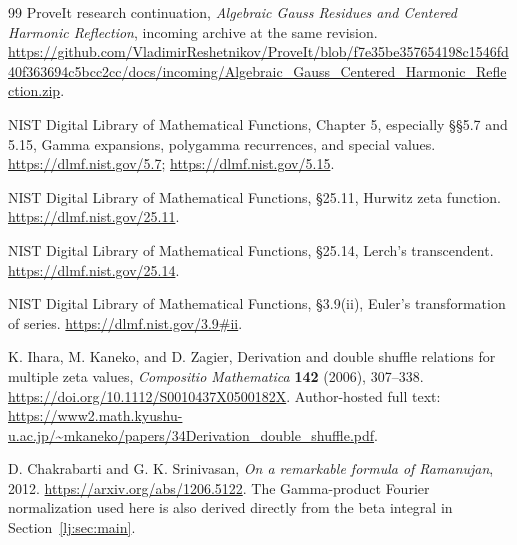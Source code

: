 \begin{thebibliography}{99}
ProveIt research continuation,
\emph{Algebraic Gauss Residues and Centered Harmonic Reflection},
incoming archive at the same revision.
\url{https://github.com/VladimirReshetnikov/ProveIt/blob/f7e35be357654198c1546fd40f363694c5bcc2cc/docs/incoming/Algebraic_Gauss_Centered_Harmonic_Reflection.zip}.

NIST Digital Library of Mathematical Functions,
Chapter 5, especially \S\S5.7 and 5.15,
Gamma expansions, polygamma recurrences, and special values.
\url{https://dlmf.nist.gov/5.7};
\url{https://dlmf.nist.gov/5.15}.

NIST Digital Library of Mathematical Functions,
\S25.11, Hurwitz zeta function.
\url{https://dlmf.nist.gov/25.11}.

NIST Digital Library of Mathematical Functions,
\S25.14, Lerch's transcendent.
\url{https://dlmf.nist.gov/25.14}.

NIST Digital Library of Mathematical Functions,
\S3.9(ii), Euler's transformation of series.
\url{https://dlmf.nist.gov/3.9#ii}.

K. Ihara, M. Kaneko, and D. Zagier,
Derivation and double shuffle relations for multiple zeta values,
\emph{Compositio Mathematica} \textbf{142} (2006), 307--338.
\url{https://doi.org/10.1112/S0010437X0500182X}.
Author-hosted full text:
\url{https://www2.math.kyushu-u.ac.jp/~mkaneko/papers/34Derivation_double_shuffle.pdf}.

D. Chakrabarti and G. K. Srinivasan,
\emph{On a remarkable formula of Ramanujan}, 2012.
\url{https://arxiv.org/abs/1206.5122}.
The Gamma-product Fourier normalization used here is also derived
directly from the beta integral in Section~\ref{lj:sec:main}.

\end{thebibliography}
\endgroup

